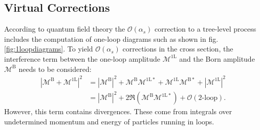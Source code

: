 \subsection{Virtual Corrections}
According to quantum field theory the $\mathcal{O}(\alpha_s)$ correction to a tree-level process includes the computation of one-loop diagrams such as shown in fig. \ref{fig:1loopdiagrams}. To yield $\mathcal{O}(\alpha_s)$ corrections in the cross section, the interference term between the one-loop amplitude $\mathcal{M}^{\mathrm{1L}}$ and the Born amplitude $\mathcal{M}^{\mathrm{B}}$ needs to be considered: 
\begin{align}
\left| \mathcal{M}^{\mathrm{B}} + \mathcal{M}^{\mathrm{1L}} \right|^2 &= \left| \mathcal{M}^{\mathrm{B}} \right|^2 + \mathcal{M}^{\mathrm{B}} \mathcal{M}^{\mathrm{1L}\ast} + \mathcal{M}^{\mathrm{1L}} \mathcal{M}^{\mathrm{B}\ast} + \left| \mathcal{M}^{\mathrm{1L}} \right|^2\nonumber\\
&= \left| \mathcal{M}^{\mathrm{B}} \right|^2 + 2 \Re \left( \mathcal{M}^{\mathrm{B}} \mathcal{M}^{\mathrm{1L}\ast} \right) + \mathcal{O}(\mbox{2-loop}).
\end{align}
However, this term contains divergences. These come from integrals over undetermined momentum and energy of particles running in loops.
